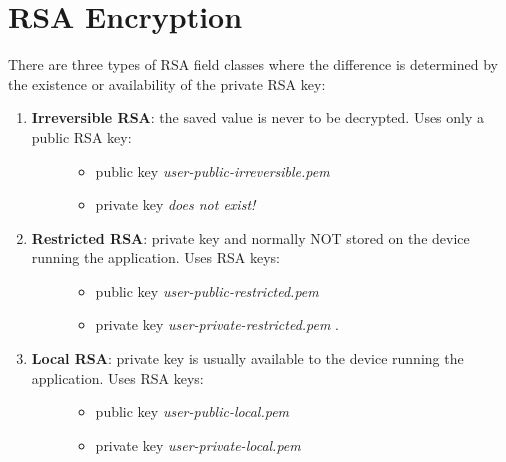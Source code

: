 \documentclass[letterpaper,10pt,english]{sphinxmanual}
\begin{document}
\section{RSA Encryption}
\label{selecting_field_classes:rsa-encryption}
There are three types of RSA field classes where the difference is determined by the existence or availability of the private RSA key:
\begin{enumerate}
\item {} \begin{description}
\item[{\textbf{Irreversible RSA}: the saved value is never to be decrypted. Uses only a public RSA key:}] \leavevmode\begin{itemize}
\item {} 
public key \emph{user-public-irreversible.pem}

\item {} 
private key \emph{does not exist!}

\end{itemize}

\end{description}

\item {} \begin{description}
\item[{\textbf{Restricted RSA}: private key and normally NOT stored on the device running the application. Uses RSA keys:}] \leavevmode\begin{itemize}
\item {} 
public key \emph{user-public-restricted.pem}

\item {} 
private key \emph{user-private-restricted.pem} .

\end{itemize}

\end{description}

\item {} \begin{description}
\item[{\textbf{Local RSA}: private key is usually available to the device running the application. Uses RSA keys:}] \leavevmode\begin{itemize}
\item {} 
public key \emph{user-public-local.pem}

\item {} 
private key \emph{user-private-local.pem}

\end{itemize}

\end{description}

\end{enumerate}
\end{document}
